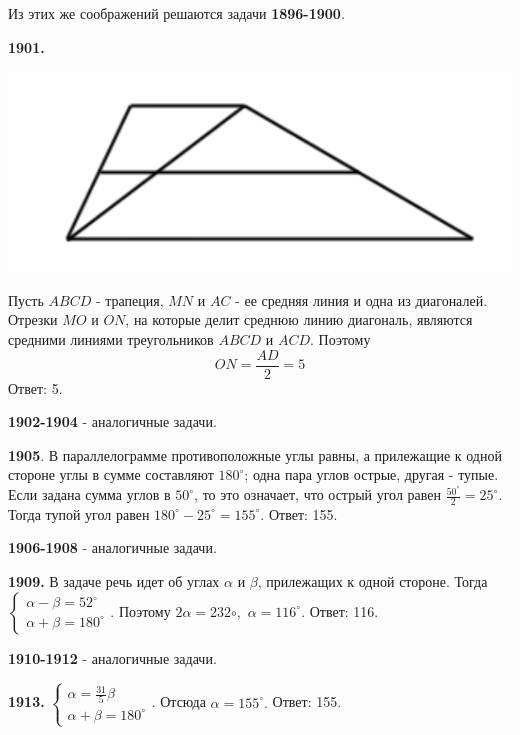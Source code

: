 Из этих же соображений решаются задачи \textbf{1896-1900}.

\textbf{1901.}

{\centering \includegraphics[width=0.5\linewidth]{Geometry/Content/25.png}
	
}

Пусть $ABCD$ - трапеция, $MN$ и $AC$ - ее средняя линия и одна из диагоналей. Отрезки $MO$ и $ON$, на которые делит среднюю линию диагональ, являются средними линиями треугольников $ABCD$ и $ACD$. Поэтому
\[
ON = \frac{AD}{2} = 5
\] \null \hspace*{\fill} Ответ: 5.

\textbf{1902-1904} - аналогичные задачи.

\textbf{1905}. В параллелограмме противоположные углы равны, а прилежащие к одной стороне углы в сумме составляют $180^\circ$; одна пара углов острые, другая - тупые. Если задана сумма углов в $50^\circ$, то это означает, что острый угол равен $\frac{50^\circ}{2} = 25^\circ$. Тогда тупой угол равен $180^\circ - 25^\circ = 155^\circ.$ \newline \null \hspace*{\fill} Ответ: 155.

\textbf{1906-1908} - аналогичные задачи.

\clearpage

\textbf{1909.} В задаче речь идет об углах $\alpha$ и $\beta$, прилежащих к одной стороне. Тогда   $\begin{cases} \alpha - \beta = 52^\circ \\ \alpha + \beta = 180^\circ \end{cases}$. Поэтому $2\alpha = 232\circ,$ $\alpha = 116^\circ.$ \newline \null \hspace*{\fill} Ответ: 116.

\textbf{1910-1912} - аналогичные задачи.

\textbf{1913.} $\begin{cases} \alpha = \frac{31}{5}\beta \\ \alpha + \beta = 180^\circ \end{cases}$. Отсюда $\alpha = 155^\circ.$ \newline \null \hspace*{\fill} Ответ: 155.

